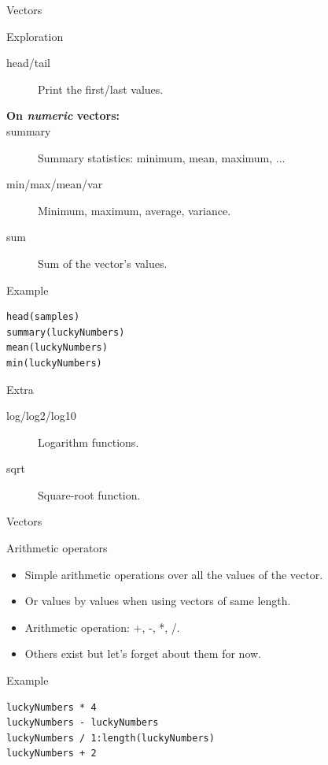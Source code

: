 \documentclass[10pt]{beamer}
\begin{document}
\begin{frame}[fragile]{Vectors}
  \begin{block}{Exploration}
    \begin{description}
    \item[head/tail] Print the first/last values.
      \medskip
    \item[{\bf\small On {\it numeric} {\sf vector}s:}]
    \item[summary] Summary statistics: minimum, mean, maximum, ...
    \item[min/max/mean/var] Minimum, maximum, average, variance.
    \item[sum] Sum of the {\sf vector}'s values.
    \end{description}
  \end{block}
  \begin{exampleblock}{Example}
\begin{verbatim}
head(samples)
summary(luckyNumbers)
mean(luckyNumbers)
min(luckyNumbers)
\end{verbatim}
  \end{exampleblock}
\begin{alertblock}{Extra}
  \begin{description}
  \item[log/log2/log10] Logarithm functions.
  \item[sqrt] Square-root function.
  \end{description}
\end{alertblock}
\end{frame}


\begin{frame}[fragile]{Vectors}
  \begin{block}{Arithmetic operators}
    \begin{itemize}
    \item Simple arithmetic operations over all the values of the {\sf vector}.
    \item Or values by values when using {\sf vector}s of same length.
    \item Arithmetic operation: +, -, *, /.
    \item Others exist but let's forget about them for now.
    \end{itemize}
  \end{block}
\begin{exampleblock}{Example}
\begin{verbatim}
luckyNumbers * 4
luckyNumbers - luckyNumbers
luckyNumbers / 1:length(luckyNumbers)
luckyNumbers + 2
\end{verbatim}
  \end{exampleblock}
\end{frame}
\end{document}
